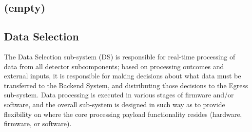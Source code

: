 




\subsection{(empty)}



\subsection{Data Selection}
\label{sec:sp-daq:design-selection-algs}


The Data Selection sub-system (DS) is responsible for real-time processing
of data from all detector subcomponents; based on processing
outcomes and external inputs, it is responsible for making decisions
about what data must be transferred to the Backend System, and
distributing those decisions to the Egress sub-system. Data processing
is executed in various stages of firmware and/or 
software, and the overall sub-system is designed in such way as to
provide flexibility on where the core processing payload functionality
resides (hardware, firmware, or software). 

